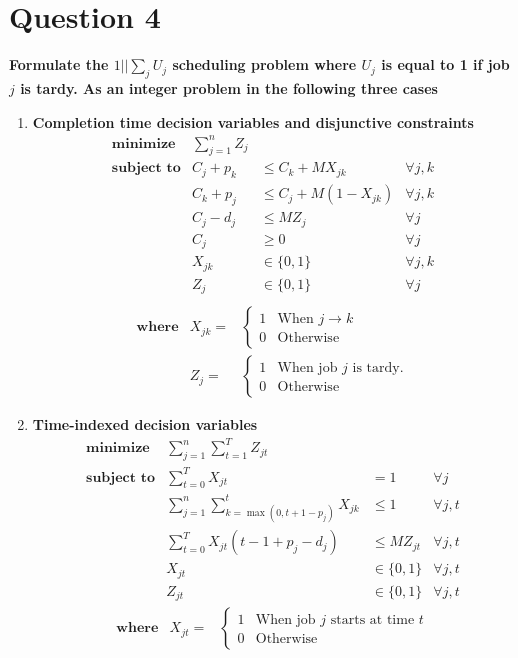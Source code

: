 \documentclass[a4paper, fleqn]{article}
\begin{document}
\section{Question 4}
\textbf{Formulate the $1||\sum_jU_j$ scheduling problem where $U_j$ is equal to 1 if job $j$ is tardy. As an integer problem in the following three cases}
\begin{enumerate}[label=(\alph{*})]
\item \textbf{Completion time decision variables and disjunctive constraints}
$$
\begin{array}{crll}
\textbf{minimize}&\sum_{j=1}^nZ_j\\
\textbf{subject to}&C_j+p_k&\leq C_k+MX_{jk}&\forall j,k\\
&C_k+p_j&\leq C_j+M(1-X_{jk})&\forall j,k\\
&C_j-d_j&\leq MZ_j&\forall j\\
&C_j&\geq0&\forall j\\
&X_{jk}&\in\{0,1\}&\forall j,k\\
&Z_j&\in\{0,1\}&\forall j\\
\end{array}
$$
$$
\begin{array}{lrl}
\textbf{where}&X_{jk}=&\left\{\begin{array}{ll}1&\text{When }j\rightarrow k\\0&\text{Otherwise}\end{array}\right.\\
&Z_{j}=&\left\{\begin{array}{ll}1&\text{When job }j\text{ is tardy.}\\0&\text{Otherwise}
\end{array}\right.
\end{array}
$$
\item \textbf{Time-indexed decision variables}
$$
\begin{array}{crll}
\textbf{minimize}&\sum_{j=1}^{n}\sum_{t=1}^TZ_{jt}\\
\textbf{subject to}&\sum_{t=0}^TX_{jt}&=1&\forall j\\
&\sum_{j=1}^n\sum_{k=\max(0,t+1-p_j)}^tX_{jk}&\leq1&\forall j,t\\
&\sum_{t=0}^TX_{jt}(t-1+p_j-d_j)&\leq MZ_{jt}&\forall j,t\\
&X_{jt}&\in\{0,1\}&\forall j,t\\
&Z_{jt}&\in\{0,1\}&\forall j,t
\end{array}
$$
$$
\begin{array}{lrl}
\textbf{where}&X_{jt}=&\left\{\begin{array}{ll}1&\text{When job }j\text{ starts at time }t\\0&\text{Otherwise}\end{array}\right.\\

\end{array}$$
\end{enumerate}
\end{document}
